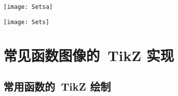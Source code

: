 \documentclass[
  paper=a4,
  pagesize=pdftex,
  twoside=false,
  toc=listof,
  BCOR=0pt,
  DIV=15,
  indent,
]{scrartcl}
\begin{document}
   

   


\begin{minipage}[c]{0.485\linewidth}
  \centering
 \texttt{[image: Setsa]}
\end{minipage}\hfill
\begin{minipage}[c]{0.485\linewidth}
  \centering
 \texttt{[image: Sets]}
\end{minipage}

\section{常见函数图像的~TikZ 实现}

\subsection{常用函数的~TikZ 绘制}
\end{document}
